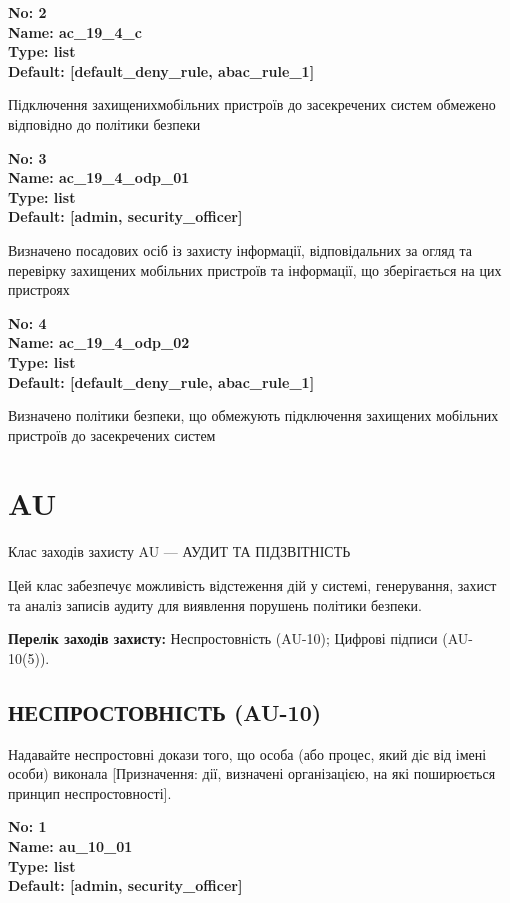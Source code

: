 \documentclass{article}
\begin{document}
{\footnotesize\bfseries
No: 2\\
Name: ac\_19\_4\_c\\
Type: list\\
Default: [\textquotedbl{}default\_deny\_rule\textquotedbl{}, \textquotedbl{}abac\_rule\_1\textquotedbl{}]
}

{\footnotesize Підключення захищенихмобільних пристроїв до засекречених систем обмежено відповідно до політики безпеки}


{\footnotesize\bfseries
No: 3\\
Name: ac\_19\_4\_odp\_01\\
Type: list\\
Default: [\textquotedbl{}admin\textquotedbl{}, \textquotedbl{}security\_officer\textquotedbl{}]
}

{\footnotesize Визначено посадових осіб із захисту інформації, відповідальних за огляд та перевірку захищених мобільних пристроїв та інформації, що зберігається на цих пристроях}


{\footnotesize\bfseries
No: 4\\
Name: ac\_19\_4\_odp\_02\\
Type: list\\
Default: [\textquotedbl{}default\_deny\_rule\textquotedbl{}, \textquotedbl{}abac\_rule\_1\textquotedbl{}]
}

{\footnotesize Визначено політики безпеки, що обмежують підключення захищених мобільних пристроїв до засекречених систем}




\section{AU}
Клас заходів захисту AU --- АУДИТ ТА ПІДЗВІТНІСТЬ

Цей клас забезпечує можливість відстеження дій у системі, генерування, захист та аналіз записів аудиту для виявлення порушень політики безпеки.

\textbf{Перелік заходів захисту:} Неспростовність (AU-10); Цифрові підписи (AU-10(5)).

\subsection{НЕСПРОСТОВНІСТЬ (AU-10)}
Надавайте неспростовні докази того, що особа (або процес, який діє від імені особи) виконала [Призначення: дії, визначені організацією, на які поширюється принцип неспростовності].

\vspace{10pt}
{\footnotesize\bfseries
No: 1\\
Name: au\_10\_01\\
Type: list\\
Default: [\textquotedbl{}admin\textquotedbl{}, \textquotedbl{}security\_officer\textquotedbl{}]
}
\end{document}
